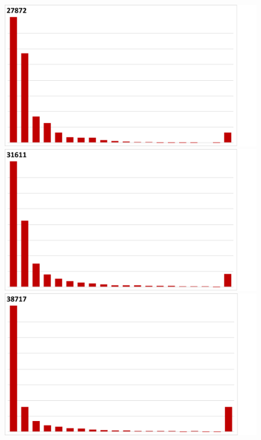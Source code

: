 \begin{figure}
\begin{minipage}[t]{0.66\linewidth}
\begin{framed}
\begin{minipage}[t]{0.24\textwidth}
\vspace{-2mm}
\end{minipage}%
\hfill
\begin{minipage}[t]{0.24\textwidth}%
\includegraphics[width=0.95\linewidth, trim={0cm 0cm 2.5cm 0cm}, clip]{results/nyx/Lag50_1_AvgL2.pdf}
\vspace{-2mm}
\end{minipage}
\begin{minipage}[t]{0.24\textwidth}%
\includegraphics[width=0.95\linewidth, trim={0cm 0cm 2.5cm 0cm}, clip]{results/nyx/Lag100_1_AvgL2.pdf}
\vspace{-2mm}
\end{minipage}%
\hfill
\begin{minipage}[t]{0.24\textwidth}%
\includegraphics[width=0.95\linewidth, trim={0cm 0cm 2.5cm 0cm}, clip]{results/nyx/Lag200_1_AvgL2.pdf}

\end{minipage}
\end{framed}
\end{minipage}
\end{figure}
